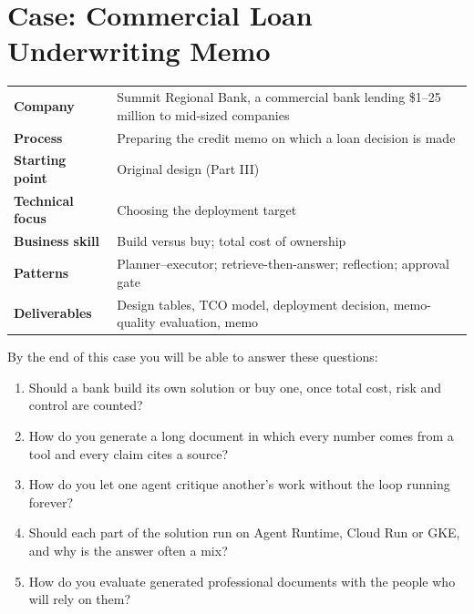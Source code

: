 
\chapter{Case: Commercial Loan Underwriting Memo}
\label{ch:case-loan}

\begin{caseglance}
\begin{tabularx}{\linewidth}{@{}>{\bfseries}p{3.4cm}X@{}}
Company & Summit Regional Bank, a commercial bank lending \$1--25 million to mid-sized companies \\
Process & Preparing the credit memo on which a loan decision is made \\
Starting point & Original design (Part III) \\
Technical focus & Choosing the deployment target \\
Business skill & Build versus buy; total cost of ownership \\
Patterns & Planner--executor; retrieve-then-answer; reflection; approval gate \\
Deliverables & Design tables, TCO model, deployment decision, memo-quality evaluation, memo
\end{tabularx}
\end{caseglance}

\begin{chapterquestions}
By the end of this case you will be able to answer these questions:
\begin{enumerate}[leftmargin=*,itemsep=2pt]
  \item Should a bank build its own solution or buy one, once total cost, risk and control are counted?
  \item How do you generate a long document in which every number comes from a tool and every claim cites a source?
  \item How do you let one agent critique another's work without the loop running forever?
  \item Should each part of the solution run on Agent Runtime, Cloud Run or GKE, and why is the answer often a mix?
  \item How do you evaluate generated professional documents with the people who will rely on them?
\end{enumerate}
\end{chapterquestions}

